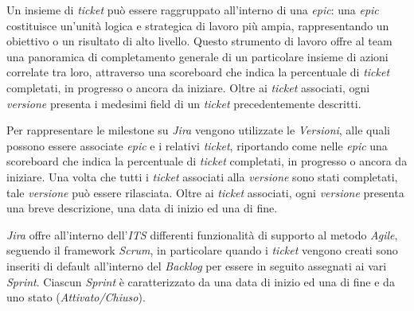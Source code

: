 \documentclass[10pt, a4paper]{article}
\begin{document}
Un insieme di \textit{ticket} può essere raggruppato all'interno di una \textit{epic}: una \textit{epic} costituisce un'unità 
logica e strategica di lavoro più ampia, rappresentando un obiettivo o un risultato di alto livello. Questo strumento di lavoro offre
al team una panoramica di completamento generale di un particolare insieme di azioni correlate tra loro, attraverso una 
scoreboard che indica la percentuale di \textit{ticket} completati, in progresso o ancora da iniziare.
Oltre ai \textit{ticket} associati, ogni \textit{versione} presenta i medesimi field di un \textit{ticket} precedentemente descritti.

Per rappresentare le milestone su \textit{Jira} vengono utilizzate le \textit{Versioni}, alle quali possono essere associate \textit{epic}
e i relativi \textit{ticket}, riportando come nelle \textit{epic} una scoreboard che indica la percentuale di \textit{ticket} completati, in progresso o ancora da iniziare.
Una volta che tutti i \textit{ticket} associati alla \textit{versione} sono stati completati, tale \textit{versione} può essere rilasciata.
Oltre ai \textit{ticket} associati, ogni \textit{versione} presenta una breve descrizione, una data di inizio ed una di fine.

\textit{Jira} offre all'interno dell'\textit{ITS} differenti funzionalità di supporto al metodo \textit{Agile\pg}, seguendo il framework \textit{Scrum\pg}, in particolare
quando i \textit{ticket} vengono creati sono inseriti di default all'interno del \textit{Backlog} per essere in seguito
assegnati ai vari \textit{Sprint}. 
Ciascun \textit{Sprint} è caratterizzato da una data di inizio ed una di fine e da uno stato (\textit{Attivato/Chiuso}).
\end{document}
